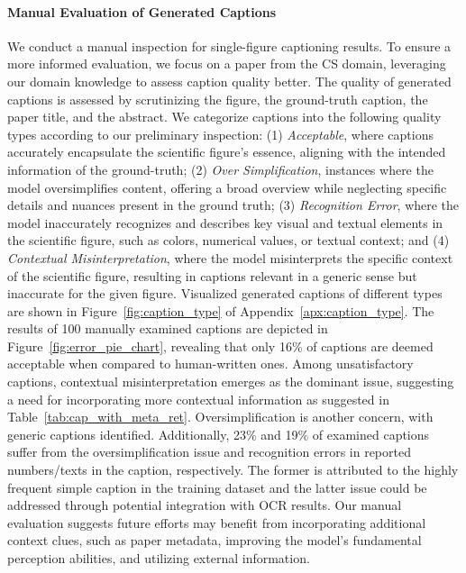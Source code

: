 \paragraph{Manual Evaluation of Generated Captions} 
\label{subsubsec:manual_eval}
We conduct a manual inspection for single-figure captioning results. To ensure a more informed evaluation, we focus on a paper from the CS domain, leveraging our domain knowledge to assess caption quality better. 
The quality of generated captions is assessed by scrutinizing the figure, the ground-truth caption, the paper title, and the abstract.
We categorize captions into the following quality types according to our preliminary inspection: (1) \emph{Acceptable}, where captions accurately encapsulate the scientific figure's essence, aligning with the intended information of the ground-truth; (2) \emph{Over Simplification}, instances where the model oversimplifies content, offering a broad overview while neglecting specific details and nuances present in the ground truth; (3) \emph{Recognition Error}, where the model inaccurately recognizes and describes key visual and textual elements in the scientific figure, such as colors, numerical values, or textual context; and (4) \emph{Contextual Misinterpretation}, where the model misinterprets the specific context of the scientific figure, resulting in captions relevant in a generic sense but inaccurate for the given figure. Visualized generated captions of different types are shown in Figure~\ref{fig:caption_type} of Appendix~\ref{apx:caption_type}.
The results of 100 manually examined captions are depicted in Figure~\ref{fig:error_pie_chart}, revealing that only 16\% of captions are deemed acceptable when compared to human-written ones. 
Among unsatisfactory captions, contextual misinterpretation emerges as the dominant issue, suggesting a need for incorporating more contextual information as suggested in Table~\ref{tab:cap_with_meta_ret}. Oversimplification is another concern, with generic captions identified. Additionally, 23\% and 19\% of examined captions suffer from the oversimplification issue and recognition errors in reported numbers/texts in the caption, respectively. The former is attributed to the highly frequent simple caption in the training dataset and the latter issue could be addressed through potential integration with OCR results.
Our manual evaluation suggests future efforts may benefit from incorporating additional context clues, such as paper metadata, improving the model's fundamental perception abilities, and utilizing external information.


